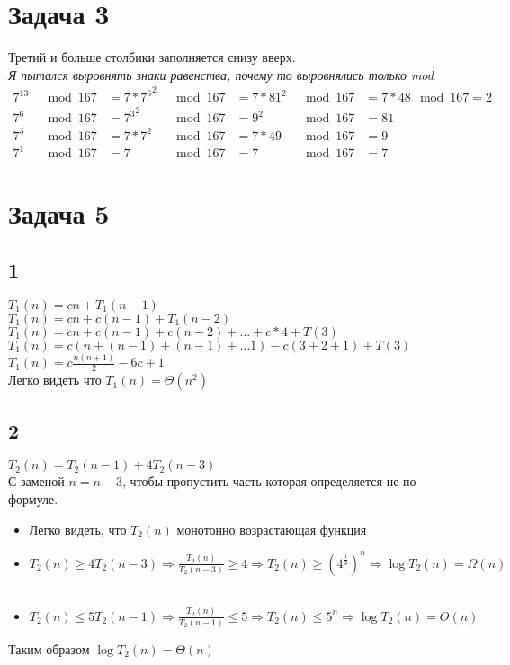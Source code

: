 \documentclass[12pt]{exam}
\begin{document}
\section*{Задача 3}
Третий и больше столбики заполняется снизу вверх.\\
\textit{Я пытался выровнять знаки равенства, почему то выровнялись только mod}
\begin{align*}
    7^{13} &\mod 167 &= 7 * {7^{6}} ^ 2 &\mod 167 &= 7 * 81^2 &\mod 167 &= 7 * 48 \mod 167 = 2\\
    7^6    &\mod 167 &= {7^{3}}^2       &\mod 167 &= 9^2      &\mod 167 &= 81\\
    7^3    &\mod 167 &= 7 * 7^2         &\mod 167 &= 7 * 49   &\mod 167 &= 9 \\
    7^1    &\mod 167 &= 7               &\mod 167 &= 7        &\mod 167 &= 7             
\end{align*}

\section*{Задача 5}
\subsection*{1}
$T_1(n) = cn + T_1(n - 1)$\\
$T_1(n) = cn + c(n - 1) + T_1(n - 2)$\\
$T_1(n) = cn + c(n - 1) + c(n - 2) + \ldots + c*4 + T(3)$\\
$T_1(n) = c(n + (n - 1) + (n - 1) + \ldots 1) - c (3 + 2 + 1) + T(3)$\\
$T_1(n) = c\frac{n (n + 1)}{2} - 6c + 1$\\
Легко видеть что $T_1(n) = \Theta(n^2)$

\subsection*{2}
$T_2(n) = T_2(n - 1) + 4T_2(n - 3)$\\
С заменой $n = n - 3$, чтобы пропустить часть которая определяется не по формуле.
\begin{itemize}
    \item Легко видеть, что $T_2(n)$ монотонно возрастающая функция
    \item $T_2(n) \geq 4T_2(n - 3) \Rightarrow \frac{T_2(n)}{T_2(n-3)} \geq 4 \Rightarrow T_2(n) \geq {(4^{\frac{1}{3}})} ^ n \Rightarrow \log T_2(n) = \Omega(n)$.
    \item $T_2(n) \leq 5T_2(n - 1) \Rightarrow \frac{T_2(n)}{T_2(n-1)} \leq 5 \Rightarrow T_2(n) \leq 5^n \Rightarrow \log T_2(n) = O(n)$
\end{itemize}
Таким образом $\log T_2(n) = \Theta (n)$
\end{document}
